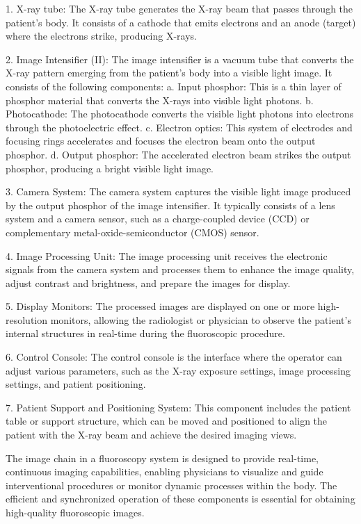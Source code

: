 \documentclass{assignment}
\begin{document}
\begin{problem}
{1. X-ray tube: The X-ray tube generates the X-ray beam that passes through the patient's body. It consists of a cathode that emits electrons and an anode (target) where the electrons strike, producing X-rays.

2. Image Intensifier (II): The image intensifier is a vacuum tube that converts the X-ray pattern emerging from the patient's body into a visible light image. It consists of the following components:
   a. Input phosphor: This is a thin layer of phosphor material that converts the X-rays into visible light photons.
   b. Photocathode: The photocathode converts the visible light photons into electrons through the photoelectric effect.
   c. Electron optics: This system of electrodes and focusing rings accelerates and focuses the electron beam onto the output phosphor.
   d. Output phosphor: The accelerated electron beam strikes the output phosphor, producing a bright visible light image.

3. Camera System: The camera system captures the visible light image produced by the output phosphor of the image intensifier. It typically consists of a lens system and a camera sensor, such as a charge-coupled device (CCD) or complementary metal-oxide-semiconductor (CMOS) sensor.

4. Image Processing Unit: The image processing unit receives the electronic signals from the camera system and processes them to enhance the image quality, adjust contrast and brightness, and prepare the images for display.

5. Display Monitors: The processed images are displayed on one or more high-resolution monitors, allowing the radiologist or physician to observe the patient's internal structures in real-time during the fluoroscopic procedure.

6. Control Console: The control console is the interface where the operator can adjust various parameters, such as the X-ray exposure settings, image processing settings, and patient positioning.

7. Patient Support and Positioning System: This component includes the patient table or support structure, which can be moved and positioned to align the patient with the X-ray beam and achieve the desired imaging views.

The image chain in a fluoroscopy system is designed to provide real-time, continuous imaging capabilities, enabling physicians to visualize and guide interventional procedures or monitor dynamic processes within the body. The efficient and synchronized operation of these components is essential for obtaining high-quality fluoroscopic images.


}
\end{problem}
\end{document}
